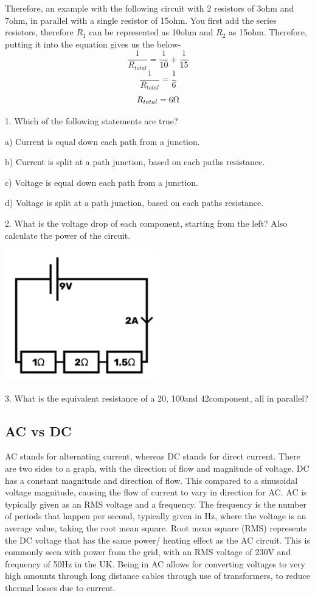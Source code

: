 \documentclass[a4paper,11pt]{report}
\newcommand{\Quiz}[1] %
{
\par\noindent %
\phantomsection %
\todo[inline, color=blue!30]{\textbf{#1}} %
\vspace{1em} %
}
\begin{document}
Therefore, an example with the following circuit with 2 resistors of 3ohm and 7ohm, in parallel with a single resistor of 15ohm. You first add the series resistors, therefore $R_1$ can be represented as 10ohm and $R_2$ as 15ohm. Therefore, putting it into the equation gives us the below-
\[\frac{1}{R_{total}} = \frac{1}{10} + \frac{1}{15}\]
\[\frac{1}{R_{total}} = \frac{1}{6}\]
\[R_{total} = 6\ohm\]

\Quiz{Quiz}

1. Which of the following statements are true?

a) Current is equal down each path from a junction.

b) Current is split at a path junction, based on each paths resistance.

c) Voltage is equal down each path from a junction.

d) Voltage is split at a path junction, based on each paths resistance.

2. What is the voltage drop of each component, starting from the left? Also calculate the power of the circuit.

\includegraphics[width=0.5\textwidth]{series3}

3. What is the equivalent resistance of a 20\ohm, 100\ohm and 42\ohm component, all in parallel?

\subsection{AC vs DC}

AC stands for alternating current, whereas DC stands for direct current. There are two sides to a graph, with the direction of flow and magnitude of voltage. DC has a constant magnitude and direction of flow. This compared to a sinusoidal voltage magnitude, causing the flow of current to vary in direction for AC. AC is typically given as an RMS voltage and a frequency. The frequency is the number of periods that happen per second, typically given in Hz, where the voltage is an average value, taking the root mean square. Root mean square (RMS) represents the DC voltage that has the same power/ heating effect as the AC circuit. This is commonly seen with power from the grid, with an RMS voltage of 230V and frequency of 50Hz in the UK.
Being in AC allows for converting voltages to very high amounts through long distance cables through use of transformers, to reduce thermal losses due to current.
\end{document}
